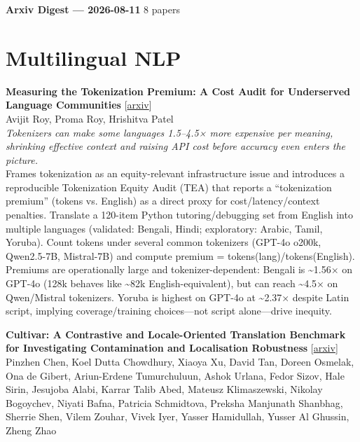 \documentclass[12pt,letterpaper]{article}
\begin{document}
{\footnotesize\textbf{Arxiv Digest --- 2026-08-11} \hfill 8 papers}

\smallskip

\section*{Multilingual NLP}

{\small\textbf{Measuring the Tokenization Premium: A Cost Audit for Underserved Language Communities}} {\scriptsize[\href{https://arxiv.org/abs/2608.09046}{arxiv}]}\\
{\scriptsize Avijit Roy, Proma Roy, Hrishitva Patel}\\

{\small\textit{Tokenizers can make some languages 1.5--4.5× more expensive per meaning, shrinking effective context and raising API cost before accuracy even enters the picture.}}\\[1pt]
{\footnotesize Frames tokenization as an equity-relevant infrastructure issue and introduces a reproducible Tokenization Equity Audit (TEA) that reports a ``tokenization premium'' (tokens vs. English) as a direct proxy for cost/latency/context penalties. Translate a 120-item Python tutoring/debugging set from English into multiple languages (validated: Bengali, Hindi; exploratory: Arabic, Tamil, Yoruba). Count tokens under several common tokenizers (GPT-4o o200k, Qwen2.5-7B, Mistral-7B) and compute premium = tokens(lang)/tokens(English). Premiums are operationally large and tokenizer-dependent: Bengali is \textasciitilde{}1.56× on GPT-4o (128k behaves like \textasciitilde{}82k English-equivalent), but can reach \textasciitilde{}4.5× on Qwen/Mistral tokenizers. Yoruba is highest on GPT-4o at \textasciitilde{}2.37× despite Latin script, implying coverage/training choices---not script alone---drive inequity.}

\medskip

{\small\textbf{Cultivar: A Contrastive and Locale-Oriented Translation Benchmark for Investigating Contamination and Localisation Robustness}} {\scriptsize[\href{https://arxiv.org/abs/2608.09766}{arxiv}]}\\
{\scriptsize Pinzhen Chen, Koel Dutta Chowdhury, Xiaoya Xu, David Tan, Doreen Osmelak, Ona de Gibert, Ariun-Erdene Tumurchuluun, Ashok Urlana, Fedor Sizov, Hale Sirin, Jesujoba Alabi, Karrar Talib Abed, Mateusz Klimaszewski, Nikolay Bogoychev, Niyati Bafna, Patricia Schmidtova, Preksha Manjunath Shanbhag, Sherrie Shen, Vilem Zouhar, Vivek Iyer, Yasser Hamidullah, Yusser Al Ghussin, Zheng Zhao}\\
\end{document}
